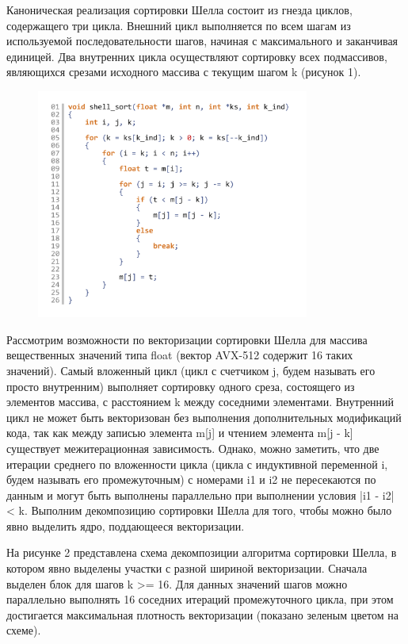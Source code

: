 Каноническая реализация сортировки Шелла состоит из гнезда циклов, содержащего три цикла. Внешний цикл выполняется по всем шагам из используемой последовательности шагов, начиная с максимального и заканчивая единицей.
Два внутренних цикла осуществляют сортировку всех подмассивов, являющихся срезами исходного массива с текущим шагом k (рисунок 1).

\begin{figure}[ht]
	\centering
		\includegraphics[width=0.8\textwidth]{./pics/text_4_vec_irreg/shell_code.pdf}
	\caption{}
	\label{fig:text_4_vec_irreg_shell_code}
\end{figure}

Рассмотрим возможности по векторизации сортировки Шелла для массива вещественных значений типа float (вектор AVX-512 содержит 16 таких значений).
Самый вложенный цикл (цикл с счетчиком j, будем называть его просто внутренним) выполняет сортировку одного среза, состоящего из элементов массива, с расстоянием k между соседними элементами.
Внутренний цикл не может быть векторизован без выполнения дополнительных модификаций кода, так как между записью элемента m[j] и чтением элемента m[j - k] существует межитерационная зависимость.
Однако, можно заметить, что две итерации среднего по вложенности цикла (цикла с индуктивной переменной i, будем называть его промежуточным) с номерами i1 и i2 не пересекаются по данным и могут быть выполнены параллельно при выполнении условия |i1 - i2| < k.
Выполним декомпозицию сортировки Шелла для того, чтобы можно было явно выделить ядро, поддающееся векторизации.

На рисунке 2 представлена схема декомпозиции алгоритма сортировки Шелла, в котором явно выделены участки с разной шириной векторизации. Сначала выделен блок для шагов k >= 16.
Для данных значений шагов можно параллельно выполнять 16 соседних итераций промежуточного цикла, при этом достигается максимальная плотность векторизации (показано зеленым цветом на схеме).

